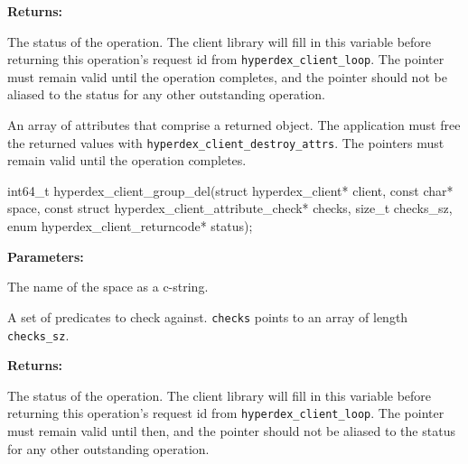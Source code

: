 \noindent\textbf{Returns:}
\begin{description}[labelindent=\widthof{{\texttt{attrs}, \texttt{attrs\_sz}}},leftmargin=*,noitemsep,nolistsep,align=right]
\item[\texttt{status}] The status of the operation.  The client library will fill in this variable before returning this operation's request id from \texttt{hyperdex\_client\_loop}.  The pointer must remain valid until the operation completes, and the pointer should not be aliased to the status for any other outstanding operation.
\item[\texttt{attrs}, \texttt{attrs\_sz}] An array of attributes that comprise a returned object.  The application must free the returned values with \texttt{hyperdex\_client\_destroy\_attrs}.  The pointers must remain valid until the operation completes.
\end{description}

\funcsep
{}
\begin{ccode}
int64_t hyperdex_client_group_del(struct hyperdex_client* client,
                const char* space,
                const struct hyperdex_client_attribute_check* checks, size_t checks_sz,
                enum hyperdex_client_returncode* status);
\end{ccode}
\funcdesc 

\noindent\textbf{Parameters:}
\begin{description}[labelindent=\widthof{{\texttt{checks}, \texttt{checks\_sz}}},leftmargin=*,noitemsep,nolistsep,align=right]
\item[\texttt{space}] The name of the space as a c-string.
\item[\texttt{checks}, \texttt{checks\_sz}] A set of predicates to check against.  \texttt{checks} points to an array of length \texttt{checks\_sz}.
\end{description}

\noindent\textbf{Returns:}
\begin{description}[labelindent=\widthof{{\texttt{status}}},leftmargin=*,noitemsep,nolistsep,align=right]
\item[\texttt{status}] The status of the operation.  The client library will fill in this variable before returning this operation's request id from \texttt{hyperdex\_client\_loop}.  The pointer must remain valid until then, and the pointer should not be aliased to the status for any other outstanding operation.
\end{description}

